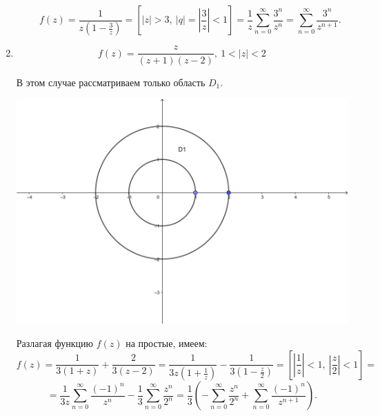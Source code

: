 \documentclass[../../main.tex]{subfiles}
\begin{document}
\begin{exmps}
\begin{enumerate}
\begin{enumerate}
			\[ f(z) = \frac{1}{z(1 - \frac{3}{z})} = \left[ |z| > 3,\ |q| = 
			\left|\frac{3}{z}\right| < 1 \right] = \frac{1}{z} \sum\limits_{n = 0}^{\infty} 
			\frac{3^n}{z^n} = \sum\limits_{n = 0}^{\infty} \frac{3^n}{z^{n + 1}}. \]
		\end{enumerate}
	
		\item \[ f(z) = \frac{z}{(z + 1)(z - 2)},\ 1 < |z| < 2 \]
		
		В этом случае рассматриваем только область $ D_1 $.
		\begin{center}
			\includegraphics[scale = 1]{lec34_2} 
		\end{center}
	
		Разлагая функцию $ f(z) $ на простые, имеем:
		\[ f(z) = \frac{1}{3(1 + z)} + \frac{2}{3(z - 2)} = \frac{1}{3z(1 + 
		\frac{1}{z})} - \frac{1}{3(1 - \frac{z}{2})} = \left[ \left|\frac{1}{z}\right| < 1,\ 
		\left|\frac{z}{2}\right| < 1 \right] = \]
		\[ = \frac{1}{3z} \sum\limits_{n = 0}^{\infty} \frac{(-1)^n}{z^n} - 
		\frac{1}{3} \sum\limits_{n = 0}^{\infty} \frac{z^n}{2^n} = \frac{1}{3} 
		\left( -\sum\limits_{n = 0}^{\infty} \frac{z^n}{2^n} + \sum\limits_{n = 
		0}^{\infty} \frac{(-1)^n}{z^{n + 1}} \right). \]
	\end{enumerate}
\end{exmps}
\end{document}
